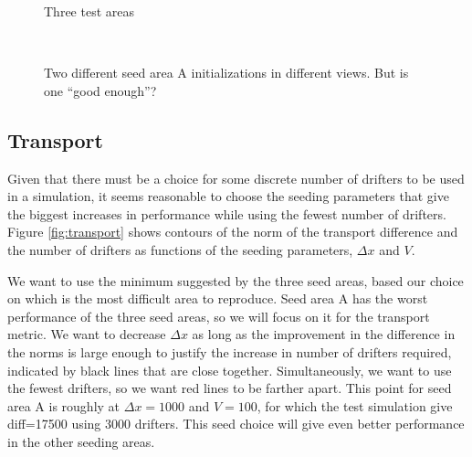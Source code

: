 \documentclass[11pt]{article}
\begin{document}
\begin{figure}
	\centering
	\caption{Three test areas}
	\label{fig:areas}
\end{figure}

\begin{figure}
	\centering
	\\
	\caption{Two different seed area A initializations in different views. But is one ``good enough''?}
	\label{fig:examples}
\end{figure}

\subsection*{Transport}

Given that there must be a choice for some discrete number of drifters to be used in a simulation, it seems reasonable to choose the seeding parameters that give the biggest increases in performance while using the fewest number of drifters. Figure \ref{fig:transport} shows contours of the norm of the transport difference and the number of drifters as functions of the seeding parameters, $\Delta x$ and $V$.

We want to use the minimum suggested by the three seed areas, based our choice on which is the most difficult area to reproduce. Seed area A has the worst performance of the three seed areas, so we will focus on it for the transport metric. We want to decrease $\Delta x$ as long as the improvement in the difference in the norms is large enough to justify the increase in number of drifters required, indicated by black lines that are close together. Simultaneously, we want to use the fewest drifters, so we want red lines to be farther apart. This point for seed area A is roughly at $\Delta x=1000$ and $V=100$, for which the test simulation give diff=17500 using 3000 drifters. This seed choice will give even better performance in the other seeding areas.
\end{document}
